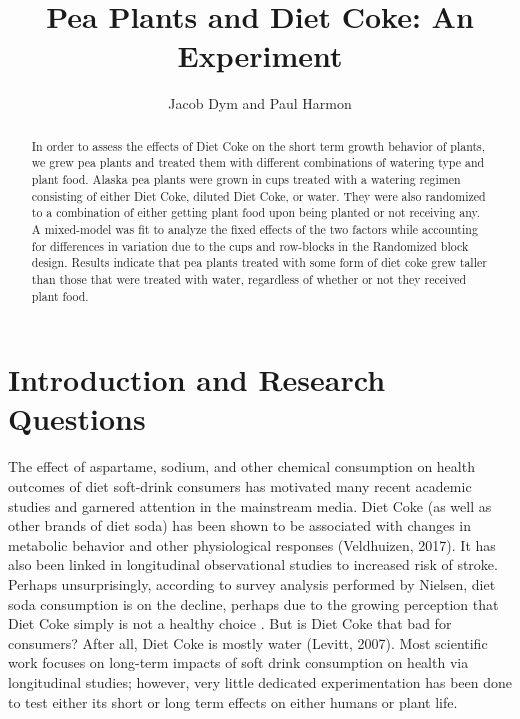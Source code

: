 \documentclass[preprint,12pt]{elsarticle}\usepackage[]{graphicx}\usepackage[]{color}
\begin{document}
\begin{frontmatter}


\title{Pea Plants and Diet Coke: An Experiment}

\author{Jacob Dym and Paul Harmon}

\address{Montana State University}

\begin{abstract}
In order to assess the effects of Diet Coke on the short term growth behavior of plants, we grew pea plants and treated them with different combinations of watering type and plant food. Alaska pea plants were grown in cups treated with a watering regimen consisting of either Diet Coke, diluted Diet Coke, or water. They were also randomized to a combination of either getting plant food upon being planted or not receiving any. A mixed-model was fit to analyze the fixed effects of the two factors while accounting for differences in variation due to the cups and row-blocks in the Randomized block design. Results indicate that pea plants treated with some form of diet coke grew taller than those that were treated with water, regardless of whether or not they received plant food. 
\end{abstract}


\end{frontmatter}



\section{Introduction and Research Questions}

The effect of aspartame, sodium, and other chemical consumption on health outcomes of diet soft-drink consumers has motivated many recent academic studies and garnered attention in the mainstream media. Diet Coke (as well as other brands of diet soda) has been shown to be associated with changes in metabolic behavior and other physiological responses (Veldhuizen, 2017). It has also been linked in longitudinal observational studies to increased risk of stroke. Perhaps unsurprisingly, according to survey analysis performed by Nielsen, diet soda consumption is on the decline, perhaps due to the growing perception that Diet Coke simply is not a healthy choice . But is Diet Coke that bad for consumers? After all, Diet Coke is mostly water (Levitt, 2007). Most scientific work focuses on long-term impacts of soft drink consumption on health via longitudinal studies; however, very little dedicated experimentation has been done to test either its short or long term effects on either humans or plant life. 
\end{document}

